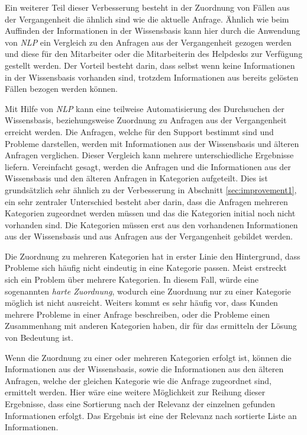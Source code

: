 Ein weiterer Teil dieser Verbesserung besteht in der Zuordnung von Fällen aus der Vergangenheit die ähnlich sind wie die aktuelle Anfrage. Ähnlich wie beim Auffinden der Informationen in der Wissensbasis kann hier durch die Anwendung von \textit{NLP} ein Vergleich zu den Anfragen aus der Vergangenheit gezogen werden und diese für den Mitarbeiter oder die Mitarbeiterin des Helpdesks zur Verfügung gestellt werden. Der Vorteil besteht darin, dass selbst wenn keine Informationen in der Wissensbasis vorhanden sind, trotzdem Informationen aus bereits gelösten Fällen bezogen werden können.

Mit Hilfe von \textit{NLP} kann eine teilweise Automatisierung des Durchsuchen der Wissensbasis, beziehungsweise Zuordnung zu Anfragen aus der Vergangenheit erreicht werden. Die Anfragen, welche für den Support bestimmt sind und Probleme darstellen, werden mit Informationen aus der Wissensbasis und älteren Anfragen verglichen. Dieser Vergleich kann mehrere unterschiedliche Ergebnisse liefern. Vereinfacht gesagt, werden die Anfragen und die Informationen aus der Wissensbasis und den älteren Anfragen in Kategorien aufgeteilt. Dies ist grundsätzlich sehr ähnlich zu der Verbesserung in Abschnitt \ref{sec:improvement1}, ein sehr zentraler Unterschied besteht aber darin, dass die Anfragen mehreren Kategorien zugeordnet werden müssen und das die Kategorien initial noch nicht vorhanden sind. Die Kategorien müssen erst aus den vorhandenen Informationen aus der Wissensbasis und aus Anfragen aus der Vergangenheit gebildet werden. 

Die Zuordnung zu mehreren Kategorien hat in erster Linie den Hintergrund, dass Probleme sich häufig nicht eindeutig in eine Kategorie passen. Meist erstreckt sich ein Problem über mehrere Kategorien. In diesem Fall, würde eine sogenannten \textit{harte Zuordnung}, wodurch eine Zuordnung nur zu einer Kategorie möglich ist nicht ausreicht. Weiters kommt es sehr häufig vor, dass Kunden mehrere Probleme in einer Anfrage beschreiben, oder die Probleme einen Zusammenhang mit anderen Kategorien haben, dir für das ermitteln der Lösung von Bedeutung ist.

Wenn die Zuordnung zu einer oder mehreren Kategorien erfolgt ist, können die Informationen aus der Wissensbasis, sowie die Informationen aus den älteren Anfragen, welche der gleichen Kategorie wie die Anfrage zugeordnet sind, ermittelt werden. Hier wäre eine weitere Möglichkeit zur Reihung dieser Ergebnisse, dass eine Sortierung nach der Relevanz der einzelnen gefunden Informationen erfolgt. Das Ergebnis ist eine der Relevanz nach sortierte Liste an Informationen.

